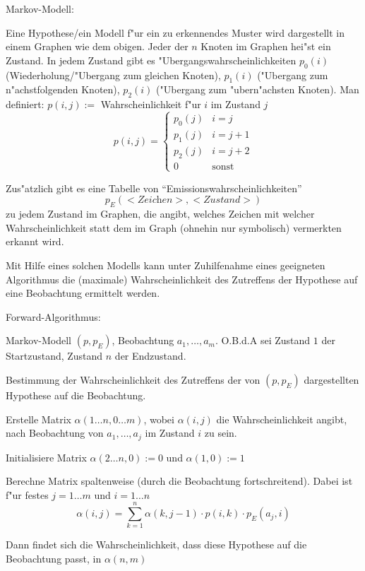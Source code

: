  Markov-Modell:{
  
  
  Eine Hypothese/ein Modell f"ur ein zu erkennendes Muster wird dargestellt in
  einem Graphen wie dem obigen. Jeder der $n$ Knoten im Graphen
  hei"st ein Zustand. In jedem Zustand gibt es "Ubergangswahrscheinlichkeiten
  $p_0(i)$ (Wiederholung/"Ubergang zum gleichen Knoten), 
  $p_1(i)$ ("Ubergang zum n"achstfolgenden Knoten), 
  $p_2(i)$ ("Ubergang zum "ubern"achsten Knoten). 
  Man definiert: $p(i,j):=$ Wahrscheinlichkeit f"ur $i$ im Zustand $j$
  \[
    p(i,j)=\begin{cases}
      p_0(j) & i=j \\
      p_1(j) & i=j+1 \\
      p_2(j) & i=j+2 \\
      0 & \text{sonst} 
    \end{cases}
  \]

  Zus"atzlich gibt es eine Tabelle von ``Emissionswahrscheinlichkeiten'' 
  \[ p_E(<\textit{Zeichen}>,<\textit{Zustand}>) \]
  zu jedem Zustand im Graphen, die angibt, welches Zeichen mit welcher 
  Wahrscheinlichkeit statt dem im Graph (ohnehin nur symbolisch) vermerkten 
  erkannt wird.
  
  Mit Hilfe eines solchen Modells kann unter Zuhilfenahme eines geeigneten
  Algorithmus die (maximale) Wahrscheinlichkeit des Zutreffens der Hypothese
  auf eine Beobachtung ermittelt werden.
}
\algorithm Forward-Algorithmus:{
  \given Markov-Modell $(p,p_E)$, Beobachtung $a_1,\ldots,a_m$. O.B.d.A sei
    Zustand $1$ der Startzustand, Zustand $n$ der Endzustand.
  
  \aim Bestimmung der Wahrscheinlichkeit des Zutreffens der von $(p,p_E)$
    dargestellten Hypothese auf die Beobachtung.
    
  \begin{proc}
    \item Erstelle Matrix $\alpha(1\ldots n,0\ldots m)$, wobei $\alpha(i,j)$ die
      Wahrscheinlichkeit angibt, nach Beobachtung von $a_1,\ldots,a_j$ im 
      Zustand $i$ zu sein.
    \item Initialisiere Matrix $\alpha(2\ldots n,0):=0$ und 
      $\alpha(1,0):=1$
    \item Berechne Matrix spaltenweise (durch die Beobachtung fortschreitend).
      Dabei ist f"ur festes $j=1\ldots m$ und $i=1\ldots n$
      \[
        \alpha(i,j)=\sum_{k=1}^{n}
          \alpha(k,j-1)\cdot p(i,k)\cdot p_E(a_j,i)
      \]
    \item Dann findet sich die Wahrscheinlichkeit, dass diese Hypothese
      auf die Beobachtung passt, in $\alpha(n,m)$
  \end{proc}
}
